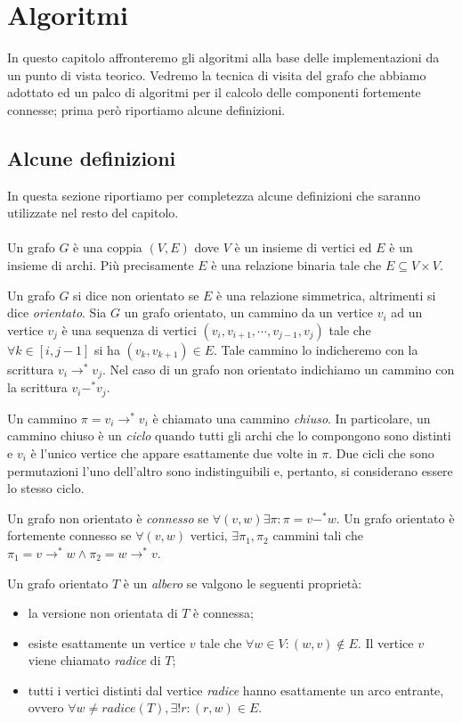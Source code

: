 \chapter{Algoritmi}
\label{chapter:theoretical-background}
In questo capitolo affronteremo gli algoritmi alla base delle
implementazioni da un punto di vista teorico. Vedremo la tecnica di
visita del grafo che abbiamo adottato ed un palco di algoritmi per il
calcolo delle componenti fortemente connesse; prima per\`o riportiamo
alcune definizioni.

\section{Alcune definizioni}
\label{subsection:some-definitions}
In questa sezione riportiamo per completezza alcune definizioni che
saranno utilizzate nel resto del capitolo.
\\\\
Un grafo $G$ \`e una coppia $(V, E)$ dove $V$ \`e un insieme di
vertici ed $E$ \`e un insieme di archi. Pi\`u precisamente $E$ \`e una
relazione binaria tale che $E \subseteq V \times V$.

Un grafo $G$ si dice non orientato se $E$ \`e una relazione
simmetrica, altrimenti si dice \emph{orientato}. Sia $G$ un grafo
orientato, un cammino da un vertice $v_{i}$ ad un vertice $v_{j}$ \`e
una sequenza di vertici $(v_{i}, v_{i+1}, \cdots, v_{j-1}, v_{j})$
tale che $\forall k \in [i, j-1]$ si ha $(v_{k},v_{k+1}) \in E$. Tale
cammino lo indicheremo con la scrittura $v_{i} \rightarrow^{*}
v_{j}$. Nel caso di un grafo non orientato indichiamo un cammino con
la scrittura $v_{i} -^{*} v_{j}$.

Un cammino $\pi = v_{i} \rightarrow^{*} v_{i}$ \`e chiamato una
cammino \emph{chiuso}. In particolare, un cammino chiuso \`e un
\emph{ciclo} quando tutti gli archi che lo compongono sono distinti e
$v_{i}$ \`e l'unico vertice che appare esattamente due volte in
$\pi$. Due cicli che sono permutazioni l'uno dell'altro sono
indistinguibili e, pertanto, si considerano essere lo stesso ciclo.

Un grafo non orientato \`e \emph{connesso} se $\forall (v, w) \exists
\pi: \pi = v -^{*} w$. Un grafo orientato \`e fortemente connesso se
$\forall (v, w)$ vertici, $\exists \pi_{1}, \pi_{2}$ cammini tali che
$\pi_{1} = v \rightarrow^{*} w \wedge \pi_{2} = w \rightarrow^{*} v$.

Un grafo orientato $T$ \`e un \emph{albero} se valgono le seguenti
propriet\`a:
\begin{itemize}
\item la versione non orientata di $T$ \`e connessa;
\item esiste esattamente un vertice $v$ tale che $\forall w \in V: (w,
  v) \not \in E$. Il vertice $v$ viene chiamato \emph{radice} di $T$;
\item tutti i vertici distinti dal vertice \emph{radice} hanno
  esattamente un arco entrante, ovvero $\forall w \not = radice(T),
  \exists!r: (r, w) \in E$.
\end{itemize}

